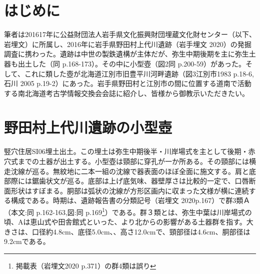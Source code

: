\documentclass[a4j,11pt,twocolumn,openany]{jsbook}
\begin{document}
\section{はじめに}
筆者は201617年に公益財団法人岩手県文化振興財団埋蔵文化財センター（以下、岩埋文）に所属し、2016年に岩手県野田村上代川遺跡（岩手埋文 2020）の発掘調査に携わった。遺跡は中世の製鉄遺構が主体だが、弥生中期後期を主に弥生土器も出土した（同 p.168-173）。その中に小型壺（図2同 p.200-59）があった。そして、これに類した壺が北海道江別市旧豊平川河畔遺跡（図3江別市1983 p.18-6,石川 2005 p.19-2）にあった。岩手県野田村と江別市の間に位置する道南で活動する南北海道考古学情報交換会会誌に紹介し、皆様から御教示いただきたい。

\section{野田村上代川遺跡の小型壺}\label{nodamura}
竪穴住居SI06埋土出土。この埋土は弥生中期後半・川岸場式を主として後期・赤穴式までの土器が出土する。小型壺は頸部に穿孔が一か所ある。その頸部には横走沈線が巡る。無紋地に二本一組の沈線で器表面のほぼ全面に施文する。肩と底部際には鋸歯状文が巡る。底部は上げ底気味、器壁厚さは比較的一定で、口唇断面形状はすぼまる。胴部は弧状の沈線が方形区画内に収まった文様が横に連続する構成である。時期は、遺跡報告書の分類記号（岩埋文 2020p.167）で群3類Ａ（本文:同 p.162-163,図:同 p.169\footnote{
	掲載表（岩埋文2020 p.371）の群4類は誤り
}）である。群３類とは、弥生中葉は川岸場式の頃、Aは恵山式や田舎館式といった、より北からの影響がある土器群を指す。大きさは、口径約4.8cm、底径5.0cm、、高さ12.0cmで、頸部径は4.6cm、胴部径は9.2cmである。
\end{document}
